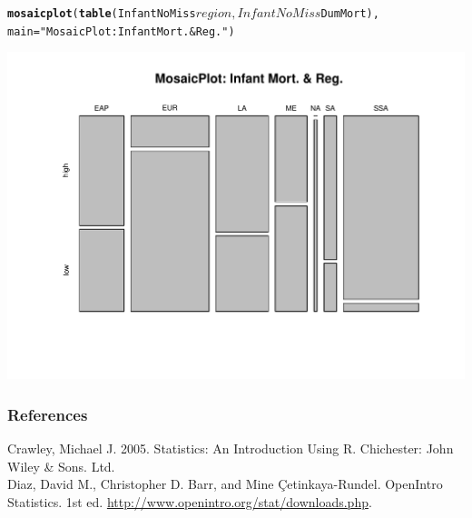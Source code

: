 \documentclass{beamer}\usepackage{graphicx, color}
\makeatletter
\def\maxwidth{ %
  \ifdim\Gin@nat@width>\linewidth
    \linewidth
  \else
    \Gin@nat@width
  \fi
}
\newcommand{\hlfunctioncall}[1]{\textcolor[rgb]{0.501960784313725,0,0.329411764705882}{\textbf{#1}}}%
\newcommand{\hlstring}[1]{\textcolor[rgb]{0.6,0.6,1}{#1}}%
\newenvironment{kframe}{%
 \def\at@end@of@kframe{}%
 \ifinner\ifhmode%
  \def\at@end@of@kframe{\end{minipage}}%
  \begin{minipage}{\columnwidth}%
 \fi\fi%
 \def\FrameCommand##1{\hskip\@totalleftmargin \hskip-\fboxsep
 \colorbox{shadecolor}{##1}\hskip-\fboxsep
     \hskip-\linewidth \hskip-\@totalleftmargin \hskip\columnwidth}%
 \MakeFramed {\advance\hsize-\width
   \@totalleftmargin\z@ \linewidth\hsize
   \@setminipage}}%
 {\par\unskip\endMakeFramed%
 \at@end@of@kframe}
\newenvironment{knitrout}{}{} %
\makeatother
\begin{document}
\begin{frame}
\begin{knitrout}
\color{fgcolor}\begin{kframe}
\begin{alltt}
\hlfunctioncall{mosaicplot}(\hlfunctioncall{table}(InfantNoMiss$region, 
            InfantNoMiss$DumMort),
            main = \hlstring{"MosaicPlot: Infant Mort. & Reg."})
\end{alltt}
\end{kframe}

{\centering \includegraphics[width=\maxwidth]{figure/MoasicPlot} 

}


\end{knitrout}

\end{frame}

\begin{frame}[allowframebreaks]
  \frametitle{References}
  Crawley, Michael J. 2005. Statistics: An Introduction Using R. Chichester: John Wiley & Sons. Ltd. \\[0.25cm]
  Diaz, David M., Christopher D. Barr, and Mine \c{C}etinkaya-Rundel. OpenIntro Statistics. 1st ed. \url{http://www.openintro.org/stat/downloads.php}. \\[0.25cm] 
\end{frame}
\end{document}
